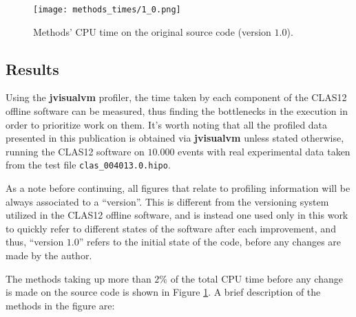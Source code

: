 \begin{figure}[ht]
    \centering
    \texttt{[image: methods\_times/1\_0.png]}
    \caption{\label{fig:methods_times-1_0} Methods' CPU time on the original source code (version $1.0$).}
\end{figure}

\newpage

\subsection{Results} \label{ssec:prof_results}
Using the \textbf{jvisualvm} profiler, the time taken by each component of the CLAS12 offline software can be measured, thus finding the bottlenecks in the execution in order to prioritize work on them.
It's worth noting that all the profiled data presented in this publication is obtained via \textbf{jvisualvm} unless stated otherwise, running the CLAS12 software on $10.000$ events with real experimental data taken from the test file \texttt{clas\_004013.0.hipo}.

As a note before continuing, all figures that relate to profiling information will be always associated to a ``version''.
This is different from the versioning system utilized in the CLAS12 offline software, and is instead one used only in this work to quickly refer to different states of the software after each improvement, and thus, ``version $1.0$'' refers to the initial state of the code, before any changes are made by the author.

The methods taking up more than $2\%$ of the total CPU time before any change is made on the source code is shown in Figure \ref{fig:methods_times-1_0}.
A brief description of the methods in the figure are:

